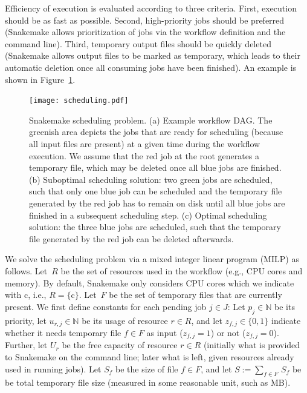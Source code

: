 \documentclass[parskip=half, DIV=18]{scrartcl}
\begin{document}
Efficiency of execution is evaluated according to three criteria.
First, execution should be as fast as possible.
Second, high-priority jobs should be preferred (Snakemake allows prioritization of jobs via the workflow definition and the command line).
Third, temporary output files should be quickly deleted (Snakemake allows output files to be marked as temporary, which leads to their automatic deletion once all consuming jobs have been finished).
An example is shown in Figure~\ref{fig:scheduling}.

\begin{figure}\centering
\texttt{[image: scheduling.pdf]}
\caption{
Snakemake scheduling problem. 
(a) Example workflow DAG.
The greenish area depicts the jobs that are ready for scheduling (because all input files are present) at a given time during the workflow execution.
We assume that the red job at the root generates a temporary file, which may be deleted once all blue jobs are finished.
(b) Suboptimal scheduling solution: two green jobs are scheduled, such that only one blue job can be scheduled and the temporary file generated by the red job has to remain on disk until all blue jobs are finished in a subsequent scheduling step. 
(c) Optimal scheduling solution: the three blue jobs are scheduled, such that the temporary file generated by the red job can be deleted afterwards.}
\label{fig:scheduling}
\end{figure}

\newcommand{\N}{\mathbb{N}}
\newcommand{\cores}{\text{c}}
\newcommand{\fueralle}{\text{ for all }}
\newcommand{\question}[1]{\textbf{({#1})}}

We solve the scheduling problem via a mixed integer linear program (MILP) as follows.
Let~$R$ be the set of resources used in the workflow (e.g., CPU cores and memory).
By default, Snakemake only considers CPU cores which we indicate with $\cores$, i.e., $R = \{\cores\}$.
Let~$F$ be the set of temporary files that are currently present.
We first define constants for each pending job $j \in J$: 
Let $p_j \in \N$ be its priority, let $u_{r,j} \in \N$ be its usage of resource $r \in R$, and let $z_{f,j} \in \{0,1\}$ indicate whether it needs temporary file $f \in F$ as input ($z_{f,j}=1$) or not ($z_{f,j}=0$).
Further, let $U_r$ be the free capacity of resource $r \in R$ (initially what is provided to Snakemake on the command line; later what is left, given resources already used in running jobs).
Let $S_f$ be the size of file $f \in F$, and let $S := \sum_{f\in F}\, S_f$ be be total temporary file size (measured in some reasonable unit, such as MB).
\end{document}
